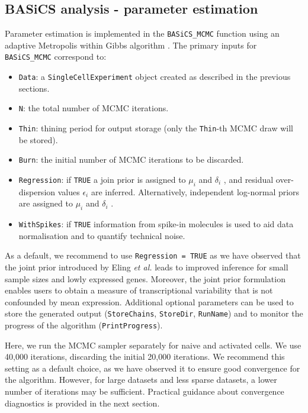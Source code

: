 \documentclass[9pt,a4paper,]{extarticle}
\begin{document}
\hypertarget{basics-analysis---parameter-estimation}{%
\subsection{BASiCS analysis - parameter estimation}\label{basics-analysis---parameter-estimation}}

Parameter estimation is implemented in the \texttt{BASiCS\_MCMC} function using an
adaptive Metropolis within Gibbs algorithm \citep{Roberts2009}.
The primary inputs for \texttt{BASiCS\_MCMC} correspond to:

\begin{itemize}
\item
  \texttt{Data}: a \texttt{SingleCellExperiment} object created as described in the previous
  sections.
\item
  \texttt{N}: the total number of MCMC iterations.
\item
  \texttt{Thin}: thining period for output storage (only the \texttt{Thin}-th MCMC draw will be stored).
\item
  \texttt{Burn}: the initial number of MCMC iterations to be discarded.
\item
  \texttt{Regression}: if \texttt{TRUE} a join prior is assigned to \(\mu_i\) and \(\delta_i\)
  \citep{Eling2018}, and residual over-dispersion values \(\epsilon_i\) are inferred.
  Alternatively, independent log-normal priors are assigned to \(\mu_i\) and
  \(\delta_i\) \citep{Vallejos2016}.
\item
  \texttt{WithSpikes}: if \texttt{TRUE} information from spike-in molecules is used to aid
  data normalisation and to quantify technical noise.
\end{itemize}

As a default, we recommend to use \texttt{Regression\ =\ TRUE} as we have observed that
the joint prior introduced by Eling \emph{et al.} leads to improved inference for
small sample sizes and lowly expressed genes.
Moreover, the joint prior formulation enables users to obtain a measure of
transcriptional variability that is not confounded by mean expression.
Additional optional parameters can be used to store the generated output
(\texttt{StoreChains}, \texttt{StoreDir}, \texttt{RunName}) and to monitor the progress of the
algorithm (\texttt{PrintProgress}).

Here, we run the MCMC sampler separately for naive and activated cells.
We use 40,000 iterations, discarding the initial 20,000 iterations.
We recommend this setting as a default choice, as we have observed it to
ensure good convergence for the algorithm.
However, for large datasets and less sparse datasets, a lower number of
iterations may be sufficient.
Practical guidance about convergence diagnostics is provided in the next section.
\end{document}
